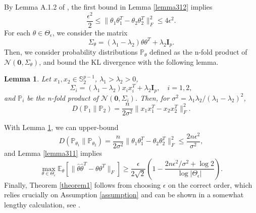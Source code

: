 \documentclass[11pt]{article}
\newtheorem{lemma}[theorem]{Lemma}
\newcommand{\E}{\mathbb{E}}
\newcommand{\gauss}{\mathcal{N}}
\renewcommand{\P}{\mathbb{P}}
\begin{document}
By Lemma A.1.2 of \citep{VL12}, the first bound in Lemma \ref{lemma312} implies 
\begin{equation*}
\frac{\epsilon^2}{2} \le \|\theta_1\theta_1^T - \theta_2\theta_2^T\|_F^2 \le 4\epsilon^2.
\end{equation*}
For each $\theta\in\Theta_\epsilon$, we consider the matrix
\begin{equation*}
\Sigma_{\theta} = (\lambda_1 - \lambda_2)\theta\theta^T + \lambda_2\mathbf{I}_p.
\end{equation*}
Then, we consider probability distributions $\P_\theta$ defined as the n-fold product of $\gauss(\mathbf{0}, \Sigma_\theta)$, and bound the KL divergence with the following lemma.
\begin{lemma}\label{lemma313}
Let $x_1,x_2\in \mathbb{S}^{p-1}_2$, $\lambda_1>\lambda_2>0$,
\begin{equation*}
\Sigma_i = (\lambda_1 - \lambda_2) x_ix_i^T + \lambda_2\mathbf{I}_p, \quad i=1,2,
\end{equation*}
and $\P_i$ be the n-fold product of $\gauss(\mathbf{0}, \Sigma_i)$. Then, for $\sigma^2 = \lambda_1\lambda_2/(\lambda_1-\lambda_2)^2$,
\begin{equation*}
D(\P_1\|\P_2) = \frac{n}{2\sigma^2}\|x_1x_1^T-x_2x_2^T\|_F^2.
\end{equation*}
\end{lemma}
With Lemma \ref{lemma313}, we can upper-bound 
\begin{equation*}
D(\P_{\theta_1}\|\P_{\theta_2}) = \frac{n}{2\sigma^2}\|\theta_1\theta_1^T - \theta_2\theta_2^T\|_F^2\le \frac{2n\epsilon^2}{\sigma^2},
\end{equation*}
and Lemma \ref{lemma311} implies
\begin{equation*}
\max_{\theta\in\Theta_\epsilon} \E_{\theta}\left[\|\hat\theta\hat\theta^T - \theta\theta^T\|_F\right] \ge \frac{\epsilon}{2\sqrt{2}}\left(1 - \frac{2n\epsilon^2/\sigma^2 + \log 2}{\log |\Theta_\epsilon|}\right).
\end{equation*}
Finally, Theorem \ref{theorem1} follows from choosing $\epsilon$ on the correct order, which relies crucially on Assumption \ref{assumption} and can be shown in a somewhat lengthy calculation, see \citep{VL12}. 
\end{document}
